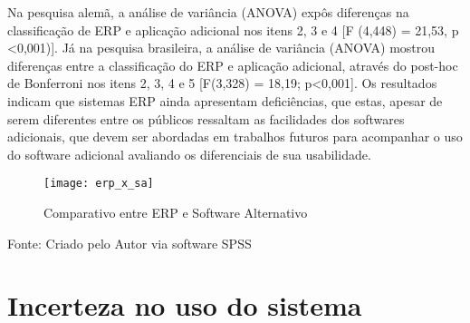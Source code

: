 \indent Na pesquisa alemã, a análise de variância (ANOVA) expôs diferenças na classificação de ERP e aplicação adicional nos itens 2, 3 e 4 [F (4,448) = 21,53, p <0,001)].  Já na pesquisa brasileira, a análise de variância (ANOVA) mostrou diferenças entre a classificação do ERP e aplicação adicional, através do post-hoc de Bonferroni nos itens 2, 3, 4 e 5  [F(3,328) = 18,19; p<0,001].\newline
\indent Os resultados indicam que sistemas ERP ainda apresentam deficiências, que estas, apesar de serem diferentes entre os públicos ressaltam as facilidades dos softwares adicionais, que devem ser abordadas em trabalhos futuros para acompanhar o uso do software adicional avaliando os diferenciais de sua usabilidade.\newline

\begin{figure}[H]
	\centering	
	\caption{Comparativo entre ERP e Software Alternativo}
	\texttt{[image: erp\_x\_sa]}
	\label{fig:figura-erp_x_sa}
\end{figure}
\vspace{-0.8 cm} \hspace{1.55 cm} Fonte: Criado pelo Autor via software SPSS

\section{Incerteza no uso do sistema}

